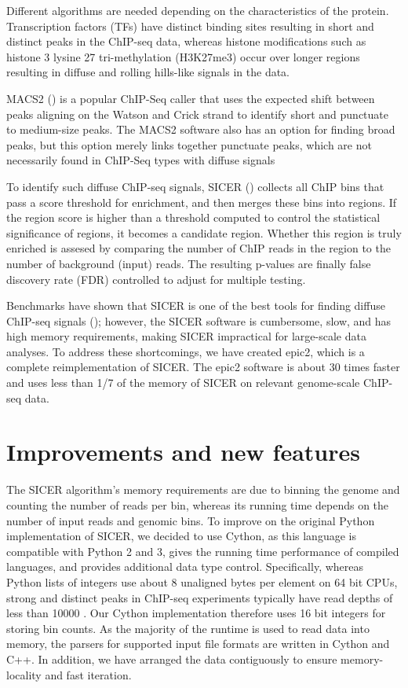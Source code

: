 \documentclass{bioinfo}
\begin{document}
Different algorithms are needed depending on the characteristics of the protein.
Transcription factors (TFs) have distinct binding sites resulting in short and
distinct peaks in the ChIP-seq data, whereas histone modifications such as
histone 3 lysine 27 tri-methylation (H3K27me3) occur over longer regions
resulting in diffuse and rolling hills-like signals in the data.

MACS2 (\cite{10.1186/gb-2008-9-9-r137}) is a popular ChIP-Seq caller that uses the
expected shift between peaks aligning on the Watson and Crick strand to identify
short and punctuate to medium-size peaks. The MACS2 software also has an option
for finding broad peaks, but this option merely links together punctuate peaks,
which are not necessarily found in ChIP-Seq types with diffuse signals

To identify such diffuse ChIP-seq signals,
SICER (\cite{doi:10.1093/bioinformatics/btp340}) collects all ChIP bins that pass a
score threshold for enrichment, and then merges these bins into regions. If the
region score is higher than a threshold computed to control the statistical
significance of regions, it becomes a candidate region. Whether this region is
truly enriched is assesed by comparing the number of ChIP reads in the region to
the number of background (input) reads. The resulting p-values are finally
false discovery rate (FDR) controlled to adjust for multiple testing.

Benchmarks have shown that SICER is one of the best tools for finding diffuse
ChIP-seq signals (\cite{doi:10.1093/bib/bbv110}); however, the SICER software is
cumbersome, slow, and has high memory requirements, making SICER impractical for
large-scale data analyses. To address these shortcomings, we have created epic2,
which is a complete reimplementation of SICER. The epic2 software is about 30
times faster and uses less than 1/7 of the memory of SICER on relevant
genome-scale ChIP-seq data.


\section{Improvements and new features}

The SICER algorithm’s memory requirements are due to binning the genome and
counting the number of reads per bin, whereas its running time depends on the
number of input reads and genomic bins. To improve on the original Python
implementation of SICER, we decided to use Cython, as this language is
compatible with Python 2 and 3, gives the running time performance of compiled
languages, and provides additional data type control. Specifically, whereas
Python lists of integers use about 8 unaligned bytes per element on 64 bit CPUs,
strong and distinct peaks in ChIP-seq experiments typically have read depths of
less than 10000 \cite{doi:10.1093/nar/gkq1187}. Our Cython implementation
therefore uses 16 bit integers for storing bin counts. As the majority of the
runtime is used to read data into memory, the parsers for supported input file
formats are written in Cython and C++. In addition, we have arranged the data
contiguously to ensure memory-locality and fast iteration.
\end{document}
